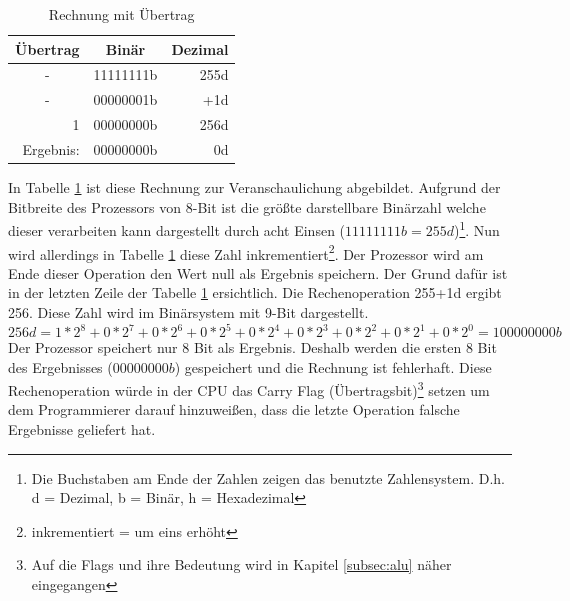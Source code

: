 \documentclass[12pt]{article}
\begin{document}
\begin{table}[!htb]
\centering
\begin{tabular}{|c|r|r|}
\hline
\textbf{Übertrag}               & \multicolumn{1}{c|}{\textbf{Binär}} & \multicolumn{1}{c|}{\textbf{Dezimal}} \\ \hline
-                               & 11111111b                            & 255d                                   \\ \hline
-                               & 00000001b                            & +1d                                     \\ \hline
\multicolumn{1}{|r|}{1}         & 00000000b                            & 256d                                   \\ \hline\hline
\multicolumn{1}{|r|}{Ergebnis:} & 00000000b                            & 0d                                     \\ \hline
\end{tabular}
\caption{Rechnung mit Übertrag}
\label{tab:uebertrag}
\end{table}

\noindent In Tabelle \ref{tab:uebertrag} ist diese Rechnung zur Veranschaulichung abgebildet. Aufgrund der Bitbreite des Prozessors von 8-Bit ist die größte darstellbare Binärzahl welche dieser verarbeiten kann dargestellt durch acht Einsen ($11111111b = 255d$)\footnote{Die Buchstaben am Ende der Zahlen zeigen das benutzte Zahlensystem. D.h. d = Dezimal, b = Binär, h = Hexadezimal}. Nun wird allerdings in Tabelle \ref{tab:uebertrag} diese Zahl inkrementiert\footnote{inkrementiert = um eins erhöht}. Der Prozessor wird am Ende dieser Operation den Wert null als Ergebnis speichern. Der Grund dafür ist in der letzten Zeile der Tabelle \ref{tab:uebertrag} ersichtlich. Die Rechenoperation 255+1d ergibt 256. Diese Zahl wird im Binärsystem mit 9-Bit dargestellt.
$$256d = 1*2^8+0*2^7+0*2^6+0*2^5+0*2^4+0*2^3+0*2^2+0*2^1+0*2^0 = 100000000b$$
Der Prozessor speichert nur 8 Bit als Ergebnis. Deshalb werden die ersten 8 Bit des Ergebnisses ($00000000b$) gespeichert und die Rechnung ist fehlerhaft. Diese Rechenoperation würde in der CPU das Carry Flag (Übertragsbit)\footnote{Auf die Flags und ihre Bedeutung wird in Kapitel \ref{subsec:alu} näher eingegangen} setzen um dem Programmierer darauf hinzuweißen, dass die letzte Operation falsche Ergebnisse geliefert hat. 
\end{document}
